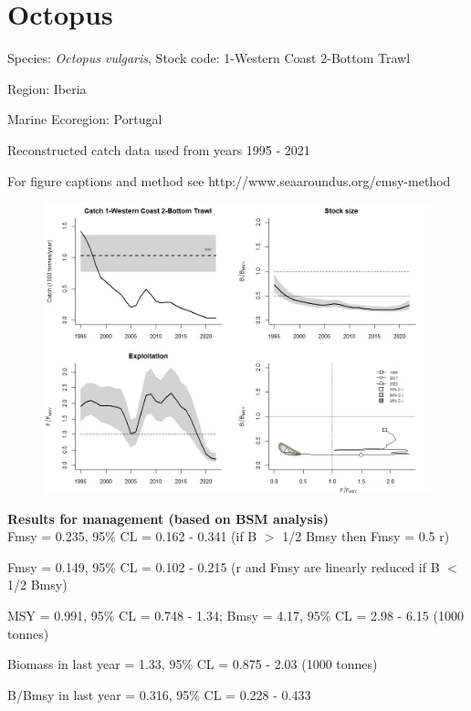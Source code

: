 \documentclass[12pt,a4paper]{article}\usepackage[]{graphicx}\usepackage[]{xcolor}
\begin{document}
    \section*{Octopus}


    Species: \emph{Octopus vulgaris}, Stock code: 1-Western Coast 2-Bottom Trawl

Region: Iberia

Marine Ecoregion: Portugal

Reconstructed catch data used from years 1995 - 2021 

 For figure captions and method see http://www.seaaroundus.org/cmsy-method

    \begin{figure}[ht]
    \centering
    \includegraphics[width=1.00\textwidth ext=.jpg type=jpg]{1-Western Coast 2-Bottom Trawl_MAN.jpg}
    \end{figure}

    \textbf{Results for management (based on BSM analysis)}\\

Fmsy = 0.235, 95\% CL = 0.162 - 0.341 (if B $>$ 1/2 Bmsy then Fmsy = 0.5 r)

Fmsy = 0.149, 95\% CL = 0.102 - 0.215 (r and Fmsy are linearly reduced if B $<$ 1/2 Bmsy)

MSY = 0.991,  95\% CL = 0.748 - 1.34; Bmsy = 4.17,  95\% CL = 2.98 - 6.15 (1000 tonnes)

Biomass in last year = 1.33, 95\% CL = 0.875 - 2.03 (1000 tonnes)

B/Bmsy in last year = 0.316, 95\% CL = 0.228 - 0.433
\end{document}
